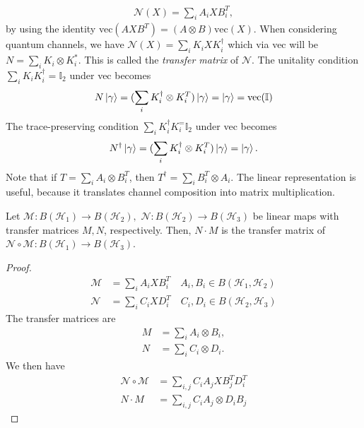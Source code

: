 \documentclass[../../note.tex]{subfiles}
\begin{document}
\begin{align}
    \mathcal{N}(X) = \sum_i A_i X B_i^T,
\end{align}
by using the identity vec$(A X B^T)=(A\otimes B)\text{vec}(X)$. When considering quantum channels, we have
$\mathcal{N}(X) = \sum_i K_i X K_i^{\dagger}$ which via vec will be $N=\sum_i K_i \otimes K_i^{*}$. This is called the \textit{transfer matrix} of $\mathcal{N}$. The unitality condition $\sum_i K_i K_i^{\dagger}=\mathbb{I}_2$ under vec becomes 
\begin{align}
    N\ket{\gamma} = (\sum_i K_i^{\dagger} \otimes K_i^T)\ket{\gamma}= \ket{\gamma}=\text{vec}(\mathbb{I})
\end{align}
The trace-preserving condition $\sum_i K_i^{\dagger} K_i^=\mathbb{I}_2$ under vec becomes 
\begin{align}
    N^{\dagger}\ket{\gamma}=(\sum_i K_i^{\dagger} \otimes K_i^{T})\ket{\gamma} = \ket{\gamma}.
\end{align}
Note that if $T=\sum_i A_i \otimes B_i^T$, then $T^{\dagger} = \sum_i B_i^T \otimes A_i.$ The linear representation is useful, because it translates channel composition into matrix multiplication. 

\begin{proposition}
Let $\mathcal{M}: B(\mathcal{H}_1)\rightarrow B(\mathcal{H}_2), $ $\mathcal{N}: B(\mathcal{H}_2)\rightarrow B(\mathcal{H}_3)$ be linear maps with transfer matrices $M,N$, respectively. Then, $N\cdot M$ is the transfer matrix of $\mathcal{N} \circ \mathcal{M}: B(\mathcal{H}_1)\rightarrow B(\mathcal{H}_3)$. 
\end{proposition}

\begin{tcolorbox}[colframe=black,breakable, colback=black!5, arc=0pt, outer arc=0pt,boxrule=0.5pt]
\begin{proof}
\begin{align}
    \mathcal{M} &=\sum_i A_i X B_i^T \quad A_i, B_i \in B(\mathcal{H}_1,\mathcal{H}_2)\\
    \mathcal{N} &= \sum_i C_i X D_i^T \quad C_i, D_i \in B(\mathcal{H}_2,\mathcal{H}_3)
\end{align}
The transfer matrices are
\begin{align}
    M &=\sum_i A_i \otimes B_i, \\
    N &= \sum_i C_i \otimes D_i. 
\end{align}
We then have 
\begin{align}
    \mathcal{N} \circ \mathcal{M} &=\sum_{i,j} C_i A_j X B_j^T D_i^T\\
    N\cdot M &= \sum_{i,j} C_i A_j \otimes D_i B_j
\end{align}
\end{proof}
\end{tcolorbox}
\end{document}
